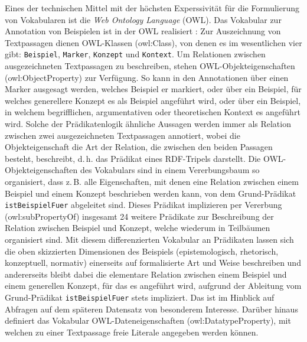 \documentclass{article}
\newcommand*{\vokabular}{\texttt}%
\newcommand*{\englisch}[1]{\foreignlanguage{english}{\textit{#1}}}%
\begin{document}
Eines der technischen Mittel mit der höchsten Experssivität für die
Formulierung von Vokabularen ist die \englisch{Web Ontology Language}
(OWL). Das Vokabular zur Annotation von Beispielen ist in der OWL
realisiert \parencite{CL2018a}: Zur Auszeichnung von Textpassagen
dienen OWL-Klassen (owl:Class), von denen es im wesentlichen vier
gibt: \vokabular{Beispiel}, \vokabular{Marker}, \vokabular{Konzept}
und \vokabular{Kontext}. Um Relationen zwischen ausgezeichneten
Textpassagen zu beschreiben, stehen OWL-Objekteigenschaften
(owl:ObjectProperty) zur Verfügung. So kann in den Annotationen über
einen Marker ausgesagt werden, welches Beispiel er markiert, oder über
ein Beispiel, für welches generellere Konzept es als Beispiel
angeführt wird, oder über ein Beispiel, in welchem begrifflichen,
argumentativen oder theoretischen Kontext es angeführt wird. Solche
der Prädikatenlogik ähnliche Aussagen werden immer als Relation
zwischen zwei ausgezeichneten Textpassagen annotiert, wobei die
Objekteigenschaft die Art der Relation, die zwischen den beiden
Passagen besteht, beschreibt, d.\,h. das Prädikat eines RDF-Tripels
darstellt. Die OWL-Objekteigenschaften des Vokabulars sind in einem
Vererbungsbaum so organisiert, dass z.\,B. alle Eigenschaften, mit
denen eine Relation zwischen einem Beispiel und einem Konzept
beschrieben werden kann, von dem Grund-Prädikat
\vokabular{istBeispielFuer} abgeleitet sind. Dieses Prädikat
implizieren per Vererbung (owl:subPropertyOf) insgesamt 24 weitere
Prädikate zur Beschreibung der Relation zwischen Beispiel und Konzept,
welche wiederum in Teilbäumen organisiert sind. Mit diesem
differenzierten Vokabular an Prädikaten lassen sich die oben
skizzierten Dimensionen des Beispiels (epistemologisch, rhetorisch,
konzeptuell, normativ) einerseits auf formalisierte Art und Weise
beschreiben und andererseits bleibt dabei die elementare Relation
zwischen einem Beispiel und einem generellen Konzept, für das es
angeführt wird, aufgrund der Ableitung vom Grund-Prädikat
\vokabular{istBeispielFuer} stets impliziert. Das ist im Hinblick auf
Abfragen auf dem späteren Datensatz von besonderem Interesse. Darüber
hinaus definiert das Vokabular OWL-Dateneigenschaften
(owl:DatatypeProperty), mit welchen zu einer Textpassage freie
Literale angegeben werden können.
\end{document}
